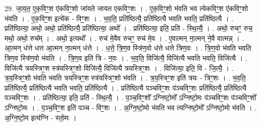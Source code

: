 \documentclass[17pt]{extarticle}
\begin{document}
29. जा॒य॒त॒ ए॒क॒विꣳ॒॒श ए॑कविꣳ॒॒शो जा॑यते जायत एकविꣳ॒॒शः । . ए॒क॒विꣳ॒॒शो भ॑वति भव त्येकविꣳ॒॒श ए॑कविꣳ॒॒शो भ॑वति । . ए॒क॒विꣳ॒॒श इत्ये॑क - विꣳ॒॒शः । . भ॒व॒ति॒ प्रति॑ष्ठित्यै॒ प्रति॑ष्ठित्यै भवति भवति॒ प्रति॑ष्ठित्यै । . प्रति॑ष्ठित्या॒ अथो॒ अथो॒ प्रति॑ष्ठित्यै॒ प्रति॑ष्ठित्या॒ अथो᳚ । . प्रति॑ष्ठित्या॒ इति॒ प्रति॑ - स्थि॒त्यै॒ । . अथो॒ रुचꣳ॒॒ रुच॒ मथो॒ अथो॒ रुच᳚म् । . अथो॒ इत्यथो᳚ । . रुच॑ मे॒वैव रुचꣳ॒॒ रुच॑ मे॒व । . ए॒वात्मन् ना॒त्मन् ने॒वै वात्मन्न् । . आ॒त्मन् ध॑त्ते धत्त आ॒त्मन् ना॒त्मन् ध॑त्ते । . ध॒त्ते॒ त्रि॒ण॒व स्त्रि॑ण॒वो ध॑त्ते धत्ते त्रिण॒वः । . त्रि॒ण॒वो भ॑वति भवति त्रिण॒व स्त्रि॑ण॒वो भ॑वति । . त्रि॒ण॒व इति॑ त्रि - न॒वः । . भ॒व॒ति॒ विजि॑त्यै॒ विजि॑त्यै भवति भवति॒ विजि॑त्यै । . विजि॑त्यै त्रयस्त्रिꣳ॒॒श स्त्र॑यस्त्रिꣳ॒॒शो विजि॑त्यै॒ विजि॑त्यै त्रयस्त्रिꣳ॒॒शः । . विजि॑त्या॒ इति॒ वि - जि॒त्यै॒ । . त्र॒य॒स्त्रिꣳ॒॒शो भ॑वति भवति त्रयस्त्रिꣳ॒॒श स्त्र॑यस्त्रिꣳ॒॒शो भ॑वति । . त्र॒य॒स्त्रिꣳ॒॒श इति॑ त्रयः - त्रिꣳ॒॒शः । . भ॒व॒ति॒ प्रति॑ष्ठित्यै॒ प्रति॑ष्ठित्यै भवति भवति॒ प्रति॑ष्ठित्यै । . प्रति॑ष्ठित्यै पञ्चविꣳ॒॒शः प॑ञ्चविꣳ॒॒शः प्रति॑ष्ठित्यै॒ प्रति॑ष्ठित्यै पञ्चविꣳ॒॒शः । . प्रति॑ष्ठित्या॒ इति॒ प्रति॑ - स्थि॒त्यै॒ । . प॒ञ्च॒विꣳ॒॒शो᳚ ऽग्निष्टो॒मो᳚ ऽग्निष्टो॒मः प॑ञ्चविꣳ॒॒शः प॑ञ्चविꣳ॒॒शो᳚ ऽग्निष्टो॒मः । . प॒ञ्च॒विꣳ॒॒श इति॑ पञ्च - विꣳ॒॒शः । . अ॒ग्नि॒ष्टो॒मो भ॑वति भव त्यग्निष्टो॒मो᳚ ऽग्निष्टो॒मो भ॑वति । . अ॒ग्नि॒ष्टो॒म इत्य॑ग्नि - स्तो॒मः । \newline
\end{document}
